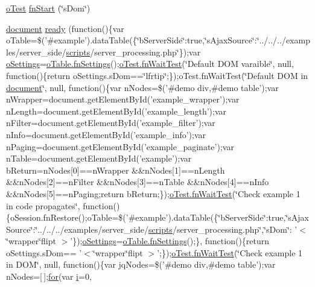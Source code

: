 \begin{DoxyCompactItemize}
\item 
\hyperlink{unit__test_8js_a3b2d259e2df3b6860d9047a92d09d0d6}{o\+Test} \hyperlink{4__server-side_2s_dom_8js_a2bc2e1c196950b5b62efc39bd1fb87dd}{fn\+Start} (\char`\"{}s\+Dom\char`\"{})
\item 
\hyperlink{outside_events_8js_aa14f8e0338cced6720590fd2ea13bd4b}{document} \hyperlink{4__server-side_2s_dom_8js_aeb8ac93c9426295c8ac456ba92cb678e}{ready} (function()\{var o\+Table=\$('\#example').data\+Table(\{\char`\"{}b\+Server\+Side\char`\"{}\+:true,\char`\"{}s\+Ajax\+Source\char`\"{}\+:\char`\"{}../../../examples/server\+\_\+side/\hyperlink{tinymce_8jquery_8dev_8js_a09066d4d580eeec222f858d588b4cdef}{scripts}/server\+\_\+processing.\+php\char`\"{}\});var \hyperlink{model_8settings_8js_a4857b9c813b4dea010668e9555d0aca7}{o\+Settings}=\hyperlink{api_8methods_8js_a78f387fab92a85c2cb7830bc5d8a6141}{o\+Table.\+fn\+Settings}();\hyperlink{onhold_24__server-side_2__zero__config_8js_ab25c4d596771c0133cdc45178ce72c3d}{o\+Test.\+fn\+Wait\+Test}(\char`\"{}Default D\+O\+M varaible\char`\"{}, null, function()\{return o\+Settings.\+s\+Dom==\char`\"{}lfrtip\char`\"{};\});o\+Test.\+fn\+Wait\+Test(\char`\"{}Default D\+O\+M in \hyperlink{outside_events_8js_aa14f8e0338cced6720590fd2ea13bd4b}{document}\char`\"{}, null, function()\{var n\+Nodes=\$('\#demo div,\#demo table');var n\+Wrapper=document.\+get\+Element\+By\+Id('example\+\_\+wrapper');var n\+Length=document.\+get\+Element\+By\+Id('example\+\_\+length');var n\+Filter=document.\+get\+Element\+By\+Id('example\+\_\+filter');var n\+Info=document.\+get\+Element\+By\+Id('example\+\_\+info');var n\+Paging=document.\+get\+Element\+By\+Id('example\+\_\+paginate');var n\+Table=document.\+get\+Element\+By\+Id('example');var b\+Return=n\+Nodes\mbox{[}0\mbox{]}==n\+Wrapper \&\&n\+Nodes\mbox{[}1\mbox{]}==n\+Length \&\&n\+Nodes\mbox{[}2\mbox{]}==n\+Filter \&\&n\+Nodes\mbox{[}3\mbox{]}==n\+Table \&\&n\+Nodes\mbox{[}4\mbox{]}==n\+Info \&\&n\+Nodes\mbox{[}5\mbox{]}==n\+Paging;return b\+Return;\});\hyperlink{onhold_24__server-side_2__zero__config_8js_ab25c4d596771c0133cdc45178ce72c3d}{o\+Test.\+fn\+Wait\+Test}(\char`\"{}Check example 1 in code propagates\char`\"{}, function()\{o\+Session.\+fn\+Restore();o\+Table=\$('\#example').data\+Table(\{\char`\"{}b\+Server\+Side\char`\"{}\+:true,\char`\"{}s\+Ajax\+Source\char`\"{}\+:\char`\"{}../../../examples/server\+\_\+side/\hyperlink{tinymce_8jquery_8dev_8js_a09066d4d580eeec222f858d588b4cdef}{scripts}/server\+\_\+processing.\+php\char`\"{},\char`\"{}s\+Dom\char`\"{}\+: '$<$\char`\"{}wrapper\char`\"{}flipt $>$'\});\hyperlink{model_8settings_8js_a4857b9c813b4dea010668e9555d0aca7}{o\+Settings}=\hyperlink{api_8methods_8js_a78f387fab92a85c2cb7830bc5d8a6141}{o\+Table.\+fn\+Settings}();\}, function()\{return o\+Settings.\+s\+Dom== '$<$\char`\"{}wrapper\char`\"{}flipt $>$';\});\hyperlink{onhold_24__server-side_2__zero__config_8js_ab25c4d596771c0133cdc45178ce72c3d}{o\+Test.\+fn\+Wait\+Test}(\char`\"{}Check example 1 in D\+O\+M\char`\"{}, null, function()\{var jq\+Nodes=\$('\#demo div,\#demo table');var n\+Nodes=\mbox{[}$\,$\mbox{]};\hyperlink{tinymce_8jquery_8dev_8js_a4675a875b20881bc5f7011f49fbd4da7}{for}(var \hyperlink{validate_8js_a5e25b1d1bed9ab5f3174b76d6a722180}{i}=0, 
\end{DoxyCompactItemize}
